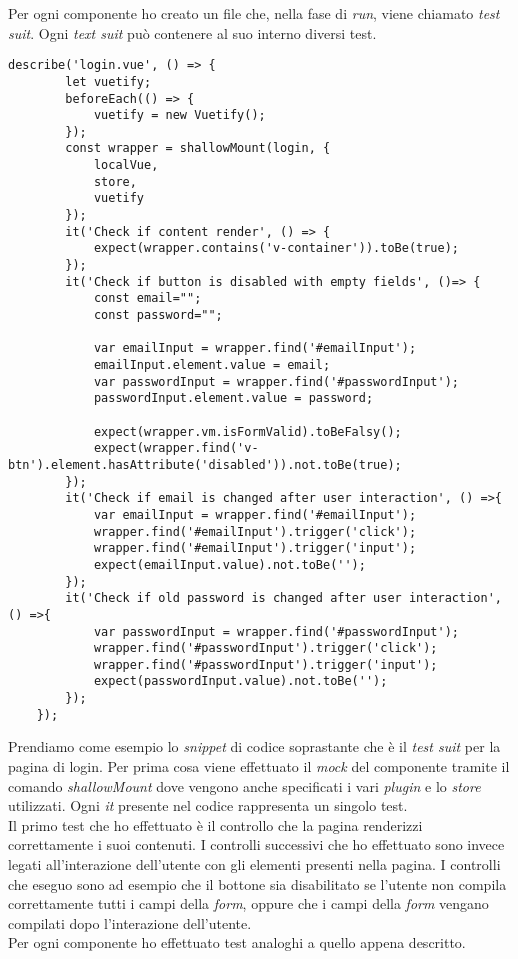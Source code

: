 Per ogni componente ho creato un file che, nella fase di \textit{run}, viene chiamato \textit{test suit}. Ogni \textit{text suit} può contenere al suo interno diversi test.
\begin{lstlisting}[caption=Esempio di test-Pagina di login., label=lst::esTest]
	describe('login.vue', () => {
		let vuetify;
		beforeEach(() => {
			vuetify = new Vuetify();
		});
		const wrapper = shallowMount(login, {
			localVue,
			store,
			vuetify
		});
		it('Check if content render', () => {
			expect(wrapper.contains('v-container')).toBe(true);
		});
		it('Check if button is disabled with empty fields', ()=> {
			const email="";
			const password="";
			
			var emailInput = wrapper.find('#emailInput');
			emailInput.element.value = email;
			var passwordInput = wrapper.find('#passwordInput');
			passwordInput.element.value = password;
			
			expect(wrapper.vm.isFormValid).toBeFalsy();
			expect(wrapper.find('v-btn').element.hasAttribute('disabled')).not.toBe(true);
		});
		it('Check if email is changed after user interaction', () =>{
			var emailInput = wrapper.find('#emailInput');
			wrapper.find('#emailInput').trigger('click');
			wrapper.find('#emailInput').trigger('input');
			expect(emailInput.value).not.toBe('');
		});
		it('Check if old password is changed after user interaction', () =>{
			var passwordInput = wrapper.find('#passwordInput');
			wrapper.find('#passwordInput').trigger('click');
			wrapper.find('#passwordInput').trigger('input');
			expect(passwordInput.value).not.toBe('');
		});
	});
\end{lstlisting}
Prendiamo come esempio lo \textit{snippet} di codice soprastante che è il \textit{test suit} per la pagina di login.
Per prima cosa viene effettuato il \textit{mock} del componente tramite il comando \textit{shallowMount} dove vengono anche specificati i vari \textit{plugin} e lo \textit{store} utilizzati. Ogni \textit{it} presente nel codice rappresenta un singolo test.\\
Il primo test che ho effettuato è il controllo che la pagina renderizzi correttamente i suoi contenuti.
I controlli successivi che ho effettuato sono invece legati all'interazione dell'utente con gli elementi presenti nella pagina. I controlli che eseguo sono ad esempio che il bottone sia disabilitato se l'utente non compila correttamente tutti i campi della \textit{form}, oppure che i campi della \textit{form} vengano compilati dopo l'interazione dell'utente.\\
Per ogni componente ho effettuato test analoghi a quello appena descritto.

